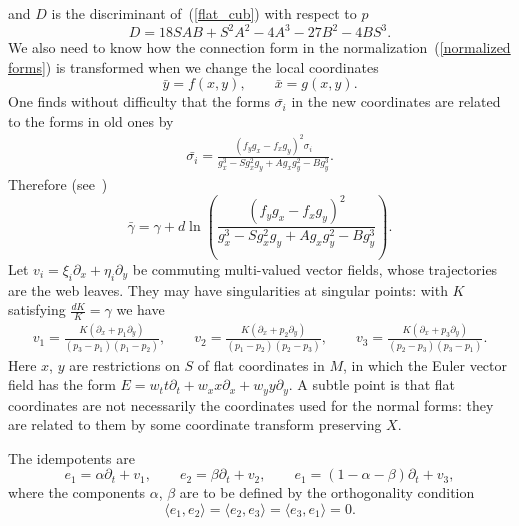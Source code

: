 and $D$ is the discriminant of~(\ref{flat_cub}) with respect to $p$
\[
D=18SAB+S^2A^2-4A^3-27B^2-4BS^3.
\]
We also need to know how the connection form in the normalization~(\ref{normalized forms})
is transformed when we change the local coordinates
\[
\bar{y}=f(x,y), \qquad \bar{x}=g(x,y).
\]
One f\/inds without dif\/f\/iculty that the forms $\bar{\sigma_i}$
in the new coordinates are related to the forms in old ones by
\begin{gather*}%
\bar{\sigma_i}=\frac{(f_yg_x-f_xg_y)^2\sigma_i}{g_x^3-Sg_x^2g_y+Ag_xg_y^2-Bg_y^3}.
\end{gather*}
Therefore (see~\cite{Be})
\begin{equation}\label{connection transforms}
\bar{\gamma}=\gamma+d\ln\left(\frac{(f_yg_x-f_xg_y)^2}{g_x^3-Sg_x^2g_y+Ag_xg_y^2-Bg_y^3}\right).
\end{equation}
Let $v_i=\xi_i \partial_x+\eta_i\partial_y$ be commuting multi-valued vector f\/ields,
whose trajectories are the web leaves. They may have singularities at singular points:
with $K$ satisfying $\frac{dK}{K}=\gamma $ we have
\begin{gather*}%
v_1=\frac{K(\partial_x +p_1 \partial_y)}{(p_3-p_1)(p_1-p_2)},\qquad
v_2=\frac{K(\partial_x +p_2 \partial_y)}{(p_1-p_2)(p_2-p_3)},\qquad
v_3=\frac{K(\partial_x +p_3 \partial_y)}{(p_2-p_3)(p_3-p_1)}.
\end{gather*}
Here $x$, $y$ are restrictions on $S$ of f\/lat coordinates in $M$, in which the Euler vector f\/ield has the form $E=w_tt\partial_t+w_xx\partial_x+w_yy\partial_y$. A subtle point is that f\/lat coordinates are not necessarily the coordinates used for the normal forms: they are related to them by some coordinate transform preserving $X$.

The idempotents are
\begin{equation}\label{idempotents}
e_1=\alpha \partial_t+v_1, \qquad e_2=\beta \partial_t+v_2,\qquad e_1=(1-\alpha -\beta) \partial_t+v_3,
\end{equation}
where the components $\alpha$, $\beta$ are to be def\/ined by the orthogonality condition
\begin{equation}\label{orthogonal}
\langle e_1,e_2\rangle =\langle e_2,e_3\rangle =\langle e_3,e_1\rangle =0.
\end{equation}

